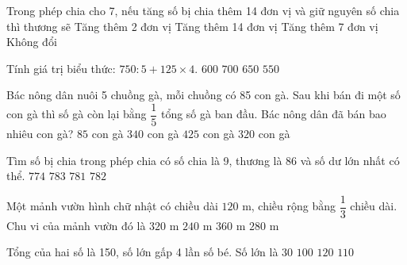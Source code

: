 \begin{ex} %
Trong phép chia cho 7, nếu tăng số bị chia thêm 14 đơn vị và giữ nguyên số chia thì thương sẽ
\choice
{\True Tăng thêm 2 đơn vị}
{Tăng thêm 14 đơn vị}
{Tăng thêm 7 đơn vị}
{Không đổi}
\end{ex}

\begin{ex} %
Tính giá trị biểu thức: $750 : 5 + 125 \times 4$.
\choice
{$600$}
{$700$}
{\True $650$}
{$550$}
\end{ex}

\begin{ex} %
Bác nông dân nuôi 5 chuồng gà, mỗi chuồng có 85 con gà. Sau khi bán đi một số con gà thì số gà còn lại bằng $\dfrac{1}{5}$ tổng số gà ban đầu. Bác nông dân đã bán bao nhiêu con gà?
\choice
{$85$ con gà}
{\True $340$ con gà}
{$425$ con gà}
{$320$ con gà}
\end{ex}

\begin{ex} %
Tìm số bị chia trong phép chia có số chia là 9, thương là 86 và số dư lớn nhất có thể.
\choice
{$774$}
{$783$}
{$781$}
{\True $782$}
\end{ex}

\begin{ex} %
Một mảnh vườn hình chữ nhật có chiều dài $120\text{ m}$, chiều rộng bằng $\dfrac{1}{3}$ chiều dài. Chu vi của mảnh vườn đó là
\choice
{\True $320\text{ m}$}
{$240\text{ m}$}
{$360\text{ m}$}
{$280\text{ m}$}
\end{ex}

\begin{ex} %
Tổng của hai số là 150, số lớn gấp 4 lần số bé. Số lớn là
\choice
{$30$}
{$100$}
{\True $120$}
{$110$}
\end{ex}


